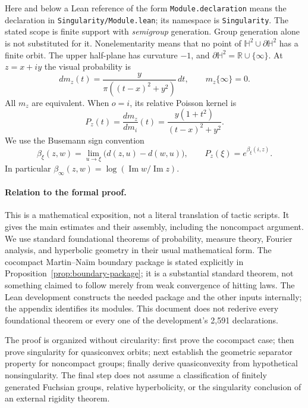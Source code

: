 \documentclass[11pt,a4paper]{article}
\newcommand{\R}{\mathbb R}
\newcommand{\HH}{\mathbb H^2}
\newcommand{\bd}{\partial\HH}
\newcommand{\im}{\operatorname{Im}}
\newcommand{\dd}{\,d}
\theoremstyle{definition}
\theoremstyle{remark}
\numberwithin{equation}{section}
\begin{document}
Here and below a Lean reference of the form \texttt{Module.declaration}
means the declaration in \texttt{Singularity/Module.lean}; its namespace
is \texttt{Singularity}. The stated scope is finite support with
\emph{semigroup} generation. Group generation alone is not substituted for it.
Nonelementarity means that no point of $\HH\cup\bd$ has a finite orbit.
The upper half-plane has curvature $-1$, and $\bd=\R\cup\{\infty\}$.
At $z=x+iy$ the visual probability is
\begin{equation}\label{eq:poisson}
 dm_z(t)=\frac{y}{\pi((t-x)^2+y^2)}\dd t,\qquad m_z\{\infty\}=0.
\end{equation}
All $m_z$ are equivalent. When $o=i$, its relative Poisson kernel is
\begin{equation}\label{eq:relative-poisson}
 P_z(t)=\frac{dm_z}{dm_i}(t)=\frac{y(1+t^2)}{(t-x)^2+y^2}.
\end{equation}
We use the Busemann sign convention
\[
 \beta_\xi(z,w)=\lim_{u\to\xi}\bigl(d(z,u)-d(w,u)\bigr),\qquad
 P_z(\xi)=e^{\beta_\xi(i,z)}.
\]
In particular $\beta_\infty(z,w)=\log(\im w/\im z)$.

\paragraph{Relation to the formal proof.}
This is a mathematical exposition, not a literal translation of tactic
scripts. It gives the main estimates and their assembly, including the
noncompact argument. We use standard foundational theorems of probability,
measure theory, Fourier analysis, and hyperbolic geometry in their usual
mathematical form. The cocompact Martin--Na\"im boundary package is stated
explicitly in Proposition~\ref{prop:boundary-package}; it is a substantial
standard theorem, not something claimed to follow merely from weak
convergence of hitting laws. The Lean development constructs the needed
package and the other inputs internally; the appendix identifies its
modules. This document does not rederive every foundational theorem or every
one of the development's 2,591 declarations.

The proof is organized without circularity: first prove the cocompact case;
then prove singularity for quasiconvex orbits; next establish the geometric
separator property for noncompact groups; finally derive quasiconvexity
from hypothetical nonsingularity. The final step does not assume a
classification of finitely generated Fuchsian groups, relative hyperbolicity,
or the singularity conclusion of an external rigidity theorem.
\end{document}
